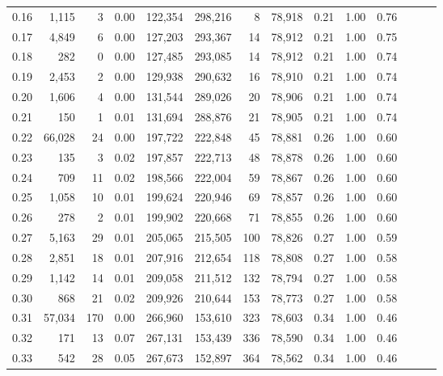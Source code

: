 \begin{tabular}{rrrrrrrrrrrrrr}
0.16 &   1,115 &       3 &  0.00 &  122,354 &  298,216 &       8 &  78,918 &  0.21 &  1.00 &      0.76 \\
0.17 &   4,849 &       6 &  0.00 &  127,203 &  293,367 &      14 &  78,912 &  0.21 &  1.00 &      0.75 \\
0.18 &     282 &       0 &  0.00 &  127,485 &  293,085 &      14 &  78,912 &  0.21 &  1.00 &      0.74 \\
0.19 &   2,453 &       2 &  0.00 &  129,938 &  290,632 &      16 &  78,910 &  0.21 &  1.00 &      0.74 \\
0.20 &   1,606 &       4 &  0.00 &  131,544 &  289,026 &      20 &  78,906 &  0.21 &  1.00 &      0.74 \\
0.21 &     150 &       1 &  0.01 &  131,694 &  288,876 &      21 &  78,905 &  0.21 &  1.00 &      0.74 \\
0.22 &  66,028 &      24 &  0.00 &  197,722 &  222,848 &      45 &  78,881 &  0.26 &  1.00 &      0.60 \\
0.23 &     135 &       3 &  0.02 &  197,857 &  222,713 &      48 &  78,878 &  0.26 &  1.00 &      0.60 \\
0.24 &     709 &      11 &  0.02 &  198,566 &  222,004 &      59 &  78,867 &  0.26 &  1.00 &      0.60 \\
0.25 &   1,058 &      10 &  0.01 &  199,624 &  220,946 &      69 &  78,857 &  0.26 &  1.00 &      0.60 \\
0.26 &     278 &       2 &  0.01 &  199,902 &  220,668 &      71 &  78,855 &  0.26 &  1.00 &      0.60 \\
0.27 &   5,163 &      29 &  0.01 &  205,065 &  215,505 &     100 &  78,826 &  0.27 &  1.00 &      0.59 \\
0.28 &   2,851 &      18 &  0.01 &  207,916 &  212,654 &     118 &  78,808 &  0.27 &  1.00 &      0.58 \\
0.29 &   1,142 &      14 &  0.01 &  209,058 &  211,512 &     132 &  78,794 &  0.27 &  1.00 &      0.58 \\
0.30 &     868 &      21 &  0.02 &  209,926 &  210,644 &     153 &  78,773 &  0.27 &  1.00 &      0.58 \\
0.31 &  57,034 &     170 &  0.00 &  266,960 &  153,610 &     323 &  78,603 &  0.34 &  1.00 &      0.46 \\
0.32 &     171 &      13 &  0.07 &  267,131 &  153,439 &     336 &  78,590 &  0.34 &  1.00 &      0.46 \\
0.33 &     542 &      28 &  0.05 &  267,673 &  152,897 &     364 &  78,562 &  0.34 &  1.00 &      0.46 \\

\end{tabular}
